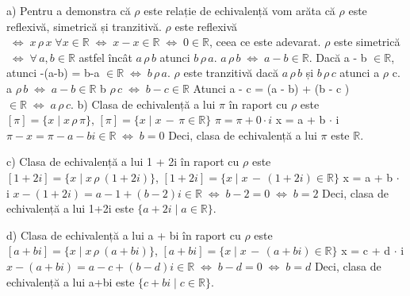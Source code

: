 \documentclass{article}
\DeclareRobustCommand\iff{\;\Longleftrightarrow\;}
\begin{document}
a) Pentru a demonstra că  $\rho$ este relație de echivalență vom arăta că $\rho$ este reflexivă, simetrică și tranzitivă.
\newline
$\rho$ este reflexivă $\iff x \, \rho \, x \; \forall x \in \mathbb{R} \iff x - x \in \mathbb{R} \iff 0 \in \mathbb{R}$, ceea ce este adevarat.
\newline
$\rho$ este simetrică $\iff \forall \, a, b \in \mathbb{R}$ astfel încât $ a \, \rho \, b $ atunci $b \, \rho \, a$.
\newline
$ a \, \rho \, b \iff a-b \in \mathbb{R}$. Dacă a - b $ \in \mathbb{R}$, atunci -(a-b) =  b-a $ \in \mathbb{R} \iff b \, \rho \, a$.
\newline
$\rho$ este tranzitivă dacă $ a \, \rho \, b $ și $b \, \rho \, c $ atunci a $\rho$ c.
\newline
a $\rho \, b \iff a - b \in \mathbb{R}$ 
b $\rho \, c \iff b - c \in \mathbb{R}$ 
\newline
Atunci a - c = (a - b) + (b - c ) $\in \mathbb{R} \iff a \, \rho \, c$.
\newline
\newline
b) Clasa de echivalență a lui $\pi$ în raport cu $\rho$ este $[\pi] = \{x \mid x \, \rho \, \pi \}$, $[\pi] = \{x \mid x \, - \, \pi \in \mathbb{R}\}$
\newline
$\pi = \pi + 0 \cdot i$
\newline
x = a + b $\cdot$ i
\newline
$\pi - x = \pi - a - bi \in \mathbb{R} \iff b = 0$
\newline
Deci, clasa de echivalență a lui $\pi$ este $\mathbb{R}$.
\newline

c)  Clasa de echivalență a lui 1 + 2i în raport cu $\rho$ este $[1+2i] = \{x \mid x \, \rho \ (1 + 2i) \}$, $[1+2i] = \{x \mid x \, - \, (1+2i) \in \mathbb{R}\}$
\newline
x = a + b $\cdot$ i
\newline
$x - (1+2i) = a - 1 + (b-2)i \in \mathbb{R} \iff b - 2 = 0 \iff b = 2$
\newline
Deci, clasa de echivalență a lui 1+2i este $\{a+2i \mid a \in \mathbb{R}\}$.

d) Clasa de echivalență a lui a + bi în raport cu $\rho$ este $[a+bi] = \{x \mid x \, \rho \ (a + bi) \}$, $[a+bi] = \{x \mid x \, - \, (a+bi) \in \mathbb{R}\}$
\newline
x = c + d $\cdot$ i
\newline
$x - (a+bi) = a - c + (b-d)i \in \mathbb{R} \iff b - d = 0 \iff b = d$
\newline
Deci, clasa de echivalență a lui a+bi este $\{c+bi \mid c \in \mathbb{R}\}$.
\newline
\end{document}

